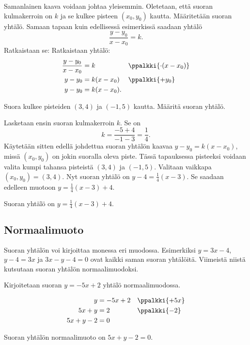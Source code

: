 Samanlainen kaava voidaan johtaa yleisemmin. Oletetaan, että suoran kulmakerroin on $k$ ja se kulkee pisteen $(x_0, y_0)$ kautta. Määritetään suoran yhtälö.
Samaan tapaan kuin edellisessä esimerkissä saadaan yhtälö
\[
\frac{y-y_0}{x-x_0}=k.
\]
Ratkaistaan se:
Ratkaistaan yhtälö:
\begin{align*}
\frac{y-y_0}{x-x_0}&=k && \ppalkki{\cdot (x-x_0)}\\
y-y_0&=k(x-x_0) && \ppalkki{+y_0} \\
y-y_0&=k(x-x_0). &&
\end{align*}


\begin{esimerkki}
Suora kulkee pisteiden $(3, 4)$ ja $(-1, 5)$ kautta. Määritä suoran yhtälö.

\begin{esimratk}
Lasketaan ensin suoran kulmakerroin $k$. Se on
\[
k=\frac{-5+4}{-1-3}=\frac{1}{4}.
\]
Käytetään sitten edellä johdettua suoran yhtälön kaavaa $y-y_0=k(x-x_0)$, missä $(x_0, y_0)$ on jokin suoralla oleva piste. Tässä tapauksessa pisteeksi voidaan valita kumpi tahansa pisteistä $(3, 4)$ ja $(-1, 5)$.
Valitaan vaikkapa $(x_0, y_0)=(3, 4)$. Nyt suoran yhtälö on $y-4=\frac{1}{4}(x-3)$. Se saadaan edelleen muotoon $y=\frac{1}{4}(x-3)+4$.
\end{esimratk}
\begin{esimvast}
Suoran yhtälö on $y=\frac{1}{4}(x-3)+4$.
\end{esimvast}
\end{esimerkki}

\subsection*{Normaalimuoto}

Suoran yhtälön voi kirjoittaa monessa eri muodossa. Esimerkiksi $y=3x-4$, $y-4=3x$ ja $3x-y-4=0$ ovat kaikki saman suoran yhtälöitä. Viimeistä niistä kutsutaan 
suoran yhtälön normaalimuodoksi.


\begin{esimerkki}
Kirjoitetaan suoran $y=-5x+2$ yhtälö normaalimuodossa.
\begin{esimratk}
\begin{align*}
y&=-5x+2 && \ppalkki{+5x} \\
5x+y&=2 && \ppalkki{-2} \\
5x+y-2&=0 &&
\end{align*}
\end{esimratk}
\begin{esimvast}
Suoran yhtälön normaalimuoto on $5x+y-2=0$.
\end{esimvast}
\end{esimerkki}


